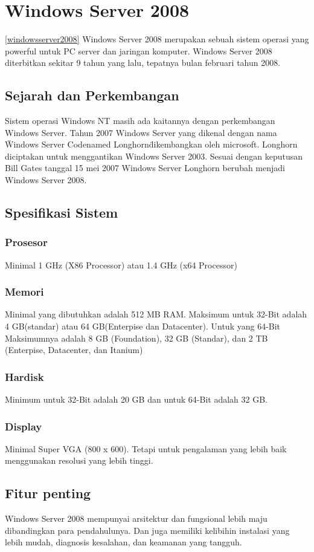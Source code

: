 	\section{Windows Server 2008}
\ref{windowsserver2008}
	Windows Server 2008 merupakan sebuah sistem operasi yang powerful untuk PC server dan jaringan komputer. Windows Server 2008 diterbitkan sekitar 9 tahun yang lalu, tepatnya bulan februari tahun 2008.\cite{wahyono2009practice}
	\subsection{Sejarah dan Perkembangan}
		Sistem operasi Windows NT masih ada kaitannya dengan perkembangan Windows Server. Tahun 2007 Windows Server yang dikenal dengan nama \" Windows Server Codenamed Longhorn\" dikembangkan oleh microsoft. Longhorn diciptakan untuk menggantikan Windows Server 2003. Sesuai dengan keputusan Bill Gates tanggal 15 mei 2007 Windows Server Longhorn berubah menjadi Windows Server 2008.
	\subsection{Spesifikasi Sistem}
		\subsubsection{Prosesor}
		Minimal 1 GHz (X86 Processor) atau 1.4 GHz (x64 Processor)
		\subsubsection{Memori}
		Minimal yang dibutuhkan adalah 512 MB RAM. Maksimum untuk 32-Bit adalah 4 GB(standar) atau 64 GB(Enterpise dan Datacenter). Untuk yang 64-Bit Maksimumnya adalah 8 GB (Foundation), 32 GB (Standar), dan 2 TB (Enterpise, Datacenter, dan Itanium)
		\subsubsection{Hardisk}
		Minimum untuk 32-Bit adalah 20 GB dan untuk 64-Bit adalah 32 GB.
		\subsubsection{Display}
		Minimal Super VGA (800 x 600). Tetapi untuk pengalaman yang lebih baik menggunakan resolusi yang lebih tinggi.
	\subsection{Fitur penting}
	Windows Server 2008 mempunyai arsitektur dan fungsional lebih maju dibandingkan para pendahulunya. Dan juga memiliki kelibihin instalasi yang lebih mudah, diagnosis kesalahan, dan keamanan yang tangguh.

